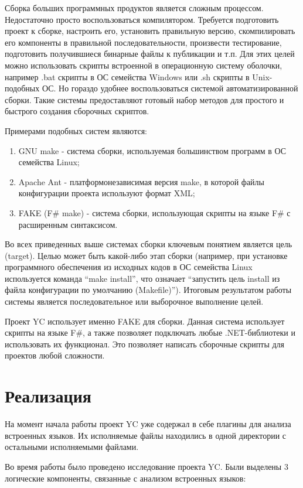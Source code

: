 \documentclass{matmex-diploma-custom}
\begin{document}
Сборка больших программных продуктов является сложным процессом. Недостаточно просто воспользоваться компилятором. Требуется подготовить проект к сборке, настроить его, установить правильную версию, скомпилировать его компоненты в правильной последовательности, произвести тестирование, подготовить получившиеся бинарные файлы к публикации и т.п. Для этих целей можно использовать скрипты встроенной в операционную систему оболочки, например .bat скрипты в ОС семейства Windows или .sh скрипты в Unix-подобных ОС. Но гораздо удобнее воспользоваться системой автоматизированной сборки. Такие системы предоставляют готовый набор методов для простого и быстрого создания сборочных скриптов.

Примерами подобных систем являются:

\begin{enumerate}
\item
GNU make - система сборки, используемая большинством программ в ОС семейства Linux;
\item
Apache Ant - платформонезависимая версия make, в которой файлы конфигурации проекта используют формат XML;
\item
FAKE (F\# make) - система сборки, использующая скрипты на языке F\# с расширенным синтаксисом.
\end{enumerate}

Во всех приведенных выше системах сборки ключевым понятием является цель (target). Целью может быть какой-либо этап сборки (например, при установке программного обеспечения из исходных кодов в ОС семейства Linux используется команда “make install”, что означает “запустить цель install из файла конфигурации по умолчанию (Makefile)”). Итоговым результатом работы системы является последовательное или выборочное выполнение целей.

Проект YC использует именно FAKE для сборки. Данная система использует скрипты на языке F\#, а также позволяет подключать любые .NET-библиотеки и использовать их функционал. Это позволяет написать сборочные скрипты для проектов любой сложности.

\section{Реализация}

На момент начала работы проект YC уже содержал в себе плагины для анализа встроенных языков. Их исполняемые файлы находились в одной директории с остальными исполняемыми файлами.

Во время работы было проведено исследование проекта YC. Были выделены 3 логические компоненты, связанные с анализом встроенных языков:
\end{document}
